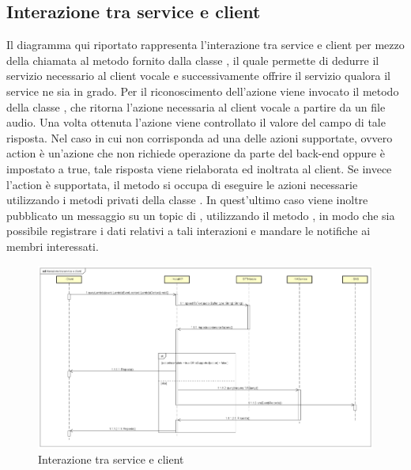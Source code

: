 \subsection{Interazione tra service e client}
Il diagramma qui riportato rappresenta l'interazione tra service e client per mezzo della chiamata al metodo  fornito dalla classe , il quale permette di dedurre il servizio necessario al client vocale e successivamente offrire il servizio qualora il service ne sia in grado. Per il riconoscimento dell'azione viene invocato il metodo  della classe , che ritorna l'azione necessaria al client vocale a partire da un file audio. Una volta ottenuta l'azione viene controllato il valore del campo  di tale risposta. Nel caso in cui  non corrisponda ad una delle azioni supportate, ovvero action è un'azione che non richiede operazione da parte del back-end oppure  è impostato a true, tale risposta viene rielaborata ed inoltrata al client. Se invece l'action è supportata, il metodo si occupa di eseguire le azioni necessarie utilizzando i metodi privati della classe . In quest'ultimo caso viene inoltre pubblicato un messaggio su un topic di , utilizzando il metodo , in modo che sia possibile registrare i dati relativi a tali interazioni e mandare le notifiche ai membri interessati. 
 \begin{figure}[h]
  \centering
  \includegraphics[width=\textwidth,height=\textheight,keepaspectratio]{images/diagrams/back-end/Ufficial_Backend/Interazionetraserviceeclient.png}
 \caption{Interazione tra service e client}
\end{figure}
\newpage
